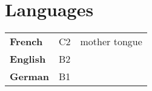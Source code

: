 \documentclass[lighthipster]{simplehipstercv}
\begin{document}
\begin{paracol}{2}
\begin{tabular}{r| p{} c}
\end{tabular}
\vspace{3em}

\begin{minipage}[t]{0.3\textwidth}
\bigskip

\section*{Languages}
\begin{tabular}{l | ll}
\textbf{French} & C2 & {\phantom{x}\footnotesize mother tongue} \\
\textbf{English} & B2 \\
\textbf{German} & B1 \\

\end{tabular}
\bigskip

\end{minipage}\hfill
\begin{minipage}[t]{0.3\textwidth}

\bigskip


\end{minipage}






\vfill{} %

\setlength{\parindent}{0pt}

\end{paracol}
\end{document}
